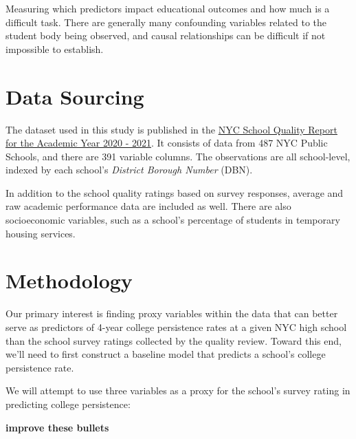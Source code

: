 \documentclass[
  man,floatsintext]{apa6}
\begin{document}
Measuring which predictors impact educational outcomes and how much is a difficult task. There are generally many confounding variables related to the student body being observed, and causal relationships can be difficult if not impossible to establish.

\hypertarget{data-sourcing}{%
\section{Data Sourcing}\label{data-sourcing}}

The dataset used in this study is published in the \href{https://data.cityofnewyork.us/Education/2020-2021-School-Quality-Reports-High-School/26je-vkp6}{NYC School Quality Report for the Academic Year 2020 - 2021}. It consists of data from 487 NYC Public Schools, and there are 391 variable columns. The observations are all school-level, indexed by each school's \emph{District Borough Number} (DBN).

In addition to the school quality ratings based on survey responses, average and raw academic performance data are included as well. There are also socioeconomic variables, such as a school's percentage of students in temporary housing services.

\hypertarget{methodology}{%
\section{Methodology}\label{methodology}}

Our primary interest is finding proxy variables within the data that can better serve as predictors of 4-year college persistence rates at a given NYC high school than the school survey ratings collected by the quality review. Toward this end, we'll need to first construct a baseline model that predicts a school's college persistence rate.

We will attempt to use three variables as a proxy for the school's survey rating in predicting college persistence:

\textbf{improve these bullets}
\end{document}
